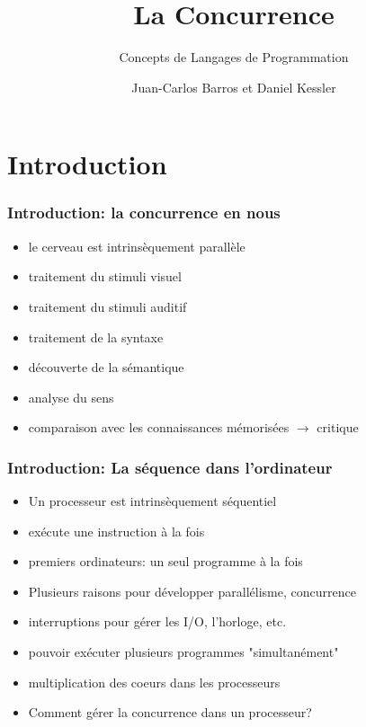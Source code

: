 \documentclass{beamer}
\title{La Concurrence}
\subtitle{Concepts de Langages de Programmation}
\author{Juan-Carlos Barros et Daniel Kessler}
\begin{document}
\begin{frame}
  \titlepage
\end{frame}

\begin{frame}
  \tableofcontents
\end{frame}

\section{Introduction}
\begin{frame}
  \frametitle{Introduction: la concurrence en nous}
  \begin{itemize}
  \item le cerveau est intrinsèquement parallèle
  \item traitement du stimuli visuel
  \item traitement du stimuli auditif
  \item traitement de la syntaxe
  \item découverte de la sémantique
  \item analyse du sens
  \item comparaison avec les connaissances mémorisées $\rightarrow$ critique
  \end{itemize}
\end{frame}

\begin{frame}
  \frametitle{Introduction: La séquence dans l'ordinateur}
  \begin{itemize}
  \item Un processeur est intrinsèquement séquentiel
  \item exécute une instruction à la fois
  \item premiers ordinateurs: un seul programme à la fois
  \item Plusieurs raisons pour développer parallélisme, concurrence
  \item interruptions pour gérer les I/O, l'horloge, etc.
  \item pouvoir exécuter plusieurs programmes "simultanément"
  \item multiplication des coeurs dans les processeurs
  \item Comment gérer la concurrence dans un processeur?
  \end{itemize}
\end{frame}
\end{document}
